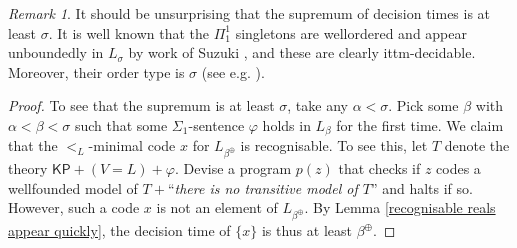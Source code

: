 \documentclass[a4paper,11pt]{amsart}
\theoremstyle{definition}
\newtheorem*{problem A}{Problem 1}
\newtheorem*{problem B}{Problem 2}
\theoremstyle{remark}
\newtheorem{remark}[fact]{Remark}
\begin{document}
\begin{remark} 
It should be unsurprising that the supremum of decision times is at least $\sigma$. 
It is well known that the $\Pi^{1}_{1}$ singletons are wellordered and appear unboundedly in $L_\sigma$ by work of Suzuki \cite{Su64}, and these are clearly ittm-decidable. Moreover, their order type is $\sigma$ (see e.g. \cite[Exercise 16.63]{Rog}). 
\end{remark} 

\begin{proof}
To see that the supremum is at least $\sigma$, take any $\alpha<\sigma$. 
Pick some $\beta$ with $\alpha<\beta<\sigma$ such that 
some $\Sigma_1$-sentence $\varphi$ holds in $L_\beta$ for the first time.
We claim that the $<_{L}$-minimal code $x$ for $L_{\beta^{\oplus}}$ is recognisable. 
To see this, let $T$ denote the theory $\mathsf{KP}+(V=L)+\varphi$. 
Devise a program $p(z)$ that checks if $z$ codes a wellfounded model of $T+$``{\em there is no transitive model of $T$}'' and halts if so. 
However, 
such a code $x$ is not an element of $L_{\beta^{\oplus}}$.
By Lemma \ref{recognisable reals appear quickly}, the decision time of $\{x\}$ is thus at least $\beta^{\oplus}$. 


\end{proof}
\end{document}

